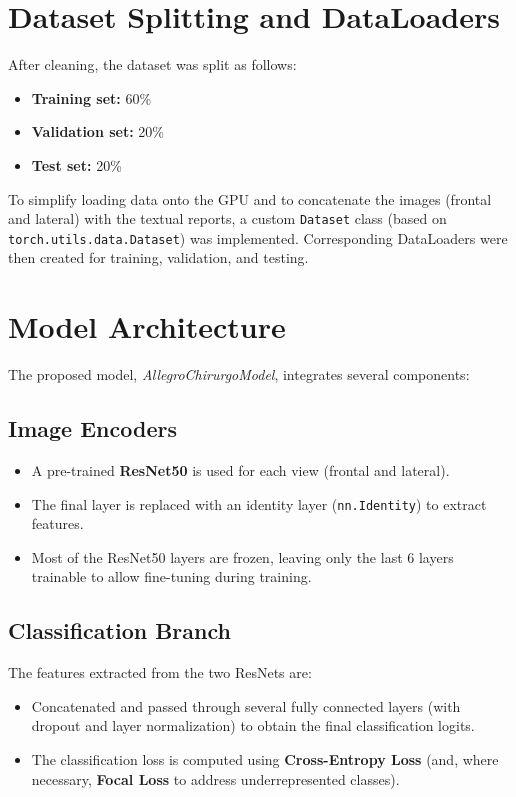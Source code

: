 \documentclass[a4paper,12pt]{article}
\begin{document}
\section{Dataset Splitting and DataLoaders}
After cleaning, the dataset was split as follows:
\begin{itemize}
    \item \textbf{Training set:} 60\%
    \item \textbf{Validation set:} 20\%
    \item \textbf{Test set:} 20\%
\end{itemize}
To simplify loading data onto the GPU and to concatenate the images (frontal and lateral) with the textual reports, a custom \texttt{Dataset} class (based on \texttt{torch.utils.data.Dataset}) was implemented. Corresponding DataLoaders were then created for training, validation, and testing.

\section{Model Architecture}
The proposed model, \textit{AllegroChirurgoModel}, integrates several components:

\subsection{Image Encoders}
\begin{itemize}
    \item A pre-trained \textbf{ResNet50} is used for each view (frontal and lateral).
    \item The final layer is replaced with an identity layer (\texttt{nn.Identity}) to extract features.
    \item Most of the ResNet50 layers are frozen, leaving only the last 6 layers trainable to allow fine-tuning during training.
\end{itemize}

\subsection{Classification Branch}
The features extracted from the two ResNets are:
\begin{itemize}
    \item Concatenated and passed through several fully connected layers (with dropout and layer normalization) to obtain the final classification logits.
    \item The classification loss is computed using \textbf{Cross-Entropy Loss} (and, where necessary, \textbf{Focal Loss} to address underrepresented classes).
\end{itemize}
\end{document}
